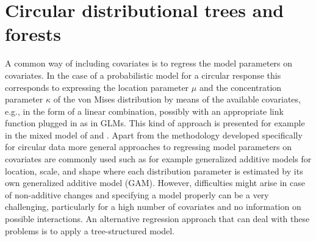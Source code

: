 \documentclass[nojss]{jss}
\numberwithin{equation}{section}
\begin{document}
\section{Circular distributional trees and forests}
\label{sec:tree_forest}
A common way of including covariates is to regress the model parameters on covariates.
In the case of a probabilistic model for a circular response this corresponds to expressing the 
location parameter $\mu$ and the concentration parameter $\kappa$ of the von Mises distribution
by means of the available covariates, e.g., in the form of a linear combination, possibly with an 
appropriate link function plugged in as in GLMs. This kind of approach is presented for example
in the mixed model of \cite{Fisher+Lee:1992} and \cite{Fisher:1993}. 
Apart from the methodology developed specifically for circular data more general approaches to 
regressing model parameters on covariates are commonly used such as for example generalized additive 
models for location, scale, and shape \citep[GAMLSS, ][]{Rigby+Stasinopoulos:2005} 
where each distribution parameter is estimated by its own generalized additive model (GAM). 
However, difficulties might arise in case of non-additive changes and specifying a model 
properly can be a very challenging, particularly for a high number of covariates and no information
on possible interactions.
An alternative regression approach that can deal with these problems is to apply a tree-structured 
model.
\end{document}
